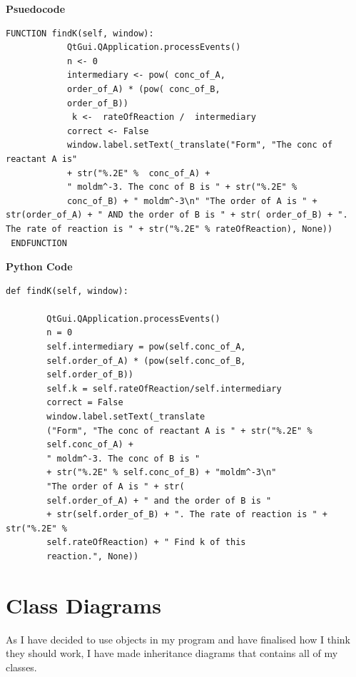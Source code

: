 \documentclass[a4paper,12pt]{report}
\begin{document}
\textbf{Psuedocode}
\begin{lstlisting}[style=customc]
 FUNCTION findK(self, window):
            QtGui.QApplication.processEvents()
            n <- 0
            intermediary <- pow( conc_of_A,
            order_of_A) * (pow( conc_of_B,
            order_of_B))
             k <-  rateOfReaction /  intermediary
            correct <- False
            window.label.setText(_translate("Form", "The conc of reactant A is" 
            + str("%.2E" %  conc_of_A) + 
            " moldm^-3. The conc of B is " + str("%.2E" % 
            conc_of_B) + " moldm^-3\n" "The order of A is " + str(order_of_A) + " AND the order of B is " + str( order_of_B) + ". The rate of reaction is " + str("%.2E" % rateOfReaction), None))
 ENDFUNCTION
\end{lstlisting}
\textbf{Python Code}
\begin{lstlisting}[style=customc]
 def findK(self, window):

        QtGui.QApplication.processEvents()
        n = 0
        self.intermediary = pow(self.conc_of_A,
        self.order_of_A) * (pow(self.conc_of_B, 
        self.order_of_B))
        self.k = self.rateOfReaction/self.intermediary
        correct = False
        window.label.setText(_translate
        ("Form", "The conc of reactant A is " + str("%.2E" %
        self.conc_of_A) + 
        " moldm^-3. The conc of B is " 
        + str("%.2E" % self.conc_of_B) + "moldm^-3\n" 
        "The order of A is " + str(
        self.order_of_A) + " and the order of B is "
        + str(self.order_of_B) + ". The rate of reaction is " + str("%.2E" % 
        self.rateOfReaction) + " Find k of this
        reaction.", None))
\end{lstlisting}


\section{Class Diagrams}
As I have decided to use objects in my program and have finalised how I think they should work, I have made inheritance diagrams that contains all of my classes. 
\end{document}
